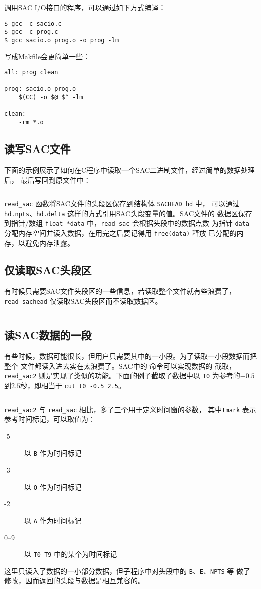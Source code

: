调用SAC I/O接口的程序，可以通过如下方式编译：
\begin{verbatim}
$ gcc -c sacio.c
$ gcc -c prog.c
$ gcc sacio.o prog.o -o prog -lm
\end{verbatim}

写成Makfile会更简单一些：
\begin{verbatim}
all: prog clean

prog: sacio.o prog.o
    $(CC) -o $@ $^ -lm

clean:
    -rm *.o
\end{verbatim}

\subsection{读写SAC文件}
下面的示例展示了如何在C程序中读取一个SAC二进制文件，经过简单的数据处理后，
最后写回到原文件中：
\inputminted{C}{./sacio/readsac.c}
\verb|read_sac| 函数将SAC文件的头段区保存到结构体 \texttt{SACHEAD hd} 中，
可以通过 \texttt{hd.npts}、\texttt{hd.delta} 这样的方式引用SAC头段变量的值。SAC文件的
数据区保存到指针/数组 \texttt{float *data} 中，\verb|read_sac| 会根据头段中的数据点数
为指针 \texttt{data} 分配内存空间并读入数据，在用完之后要记得用 \texttt{free(data)} 释放
已分配的内存，以避免内存泄露。

\subsection{仅读取SAC头段区}
有时候只需要SAC文件头段区的一些信息，若读取整个文件就有些浪费了，
\verb|read_sachead| 仅读取SAC头段区而不读取数据区。
\inputminted{C}{./sacio/readsachead.c}

\subsection{读SAC数据的一段}
有些时候，数据可能很长，但用户只需要其中的一小段。为了读取一小段数据而把整个
文件都读入进去实在太浪费了。SAC中的  命令可以实现数据的
截取，\verb|read_sac2| 则是实现了类似的功能。下面的例子截取了数据中以 \texttt{T0}
为参考的$-0.5$到$2.5$秒，即相当于 \texttt{cut t0 -0.5 2.5}。
\inputminted{C}{./sacio/readsac2.c}
\verb|read_sac2| 与 \verb|read_sac| 相比，多了三个用于定义时间窗的参数，
其中\texttt{tmark} 表示参考时间标记，可以取值为：
\begin{description}
\item[-5] 以 \texttt{B} 作为时间标记
\item[-3] 以 \texttt{O} 作为时间标记
\item[-2] 以 \texttt{A} 作为时间标记
\item[0--9] 以 \texttt{T0-T9} 中的某个为时间标记
\end{description}
这里只读入了数据的一小部分数据，但子程序中对头段中的 \texttt{B}、\texttt{E}、\texttt{NPTS} 等
做了修改，因而返回的头段与数据是相互兼容的。

